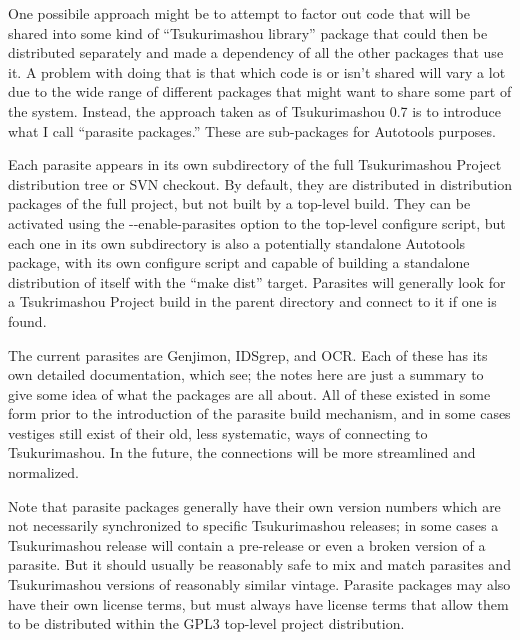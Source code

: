 \documentclass[14pt]{extarticle}
\begin{document}
One possibile approach might be to attempt to factor out code that will be
shared into some kind of ``Tsukurimashou library'' package that could then
be distributed separately and made a dependency of all the other packages
that use it.  A problem with doing that is that which code is or isn't
shared will vary a lot due to the wide range of different packages that
might want to share some part of the system.  Instead, the approach taken as
of Tsukurimashou 0.7 is to introduce what I call ``parasite packages.''
These are sub-packages for Autotools purposes.

Each parasite appears in its own subdirectory of the full Tsukurimashou
Project distribution tree or SVN checkout.  By default, they are distributed
in distribution packages of the full project, but not built by a top-level
build.  They can be activated using the -{}-enable-parasites option to the
top-level configure script, but each one in its own subdirectory is also a
potentially standalone Autotools package, with its own configure script and
capable of building a standalone distribution of itself with the ``make
dist'' target.  Parasites will generally look for a Tsukrimashou Project
build in the parent directory and connect to it if one is found.

The current parasites are Genjimon, IDSgrep, and OCR.  Each of these has its
own detailed documentation, which see; the notes here are just a summary to
give some idea of what the packages are all about.  All of these existed in
some form prior to the introduction of the parasite build mechanism, and in
some cases vestiges still exist of their old, less systematic, ways of
connecting to Tsukurimashou.  In the future, the connections will be more
streamlined and normalized.

Note that parasite packages generally have their own version numbers which
are not necessarily synchronized to specific Tsukurimashou releases; in some
cases a Tsukurimashou release will contain a pre-release or even a broken
version of a parasite.  But it should usually be reasonably safe to mix and
match parasites and Tsukurimashou versions of reasonably similar vintage. 
Parasite packages may also have their own license terms, but must always
have license terms that allow them to be distributed within the GPL3
top-level project distribution.
\end{document}
